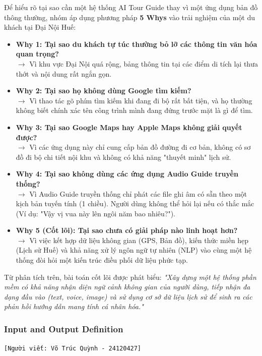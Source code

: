 Để hiểu rõ tại sao cần một hệ thống AI Tour Guide thay vì một ứng dụng bản đồ thông thường, nhóm áp dụng phương pháp \textbf{5 Whys} vào trải nghiệm của một du khách tại Đại Nội Huế:
\begin{itemize}
    \item \textbf{Why 1: Tại sao du khách tự túc thường bỏ lỡ các thông tin văn hóa quan trọng?} \\
    $\rightarrow$ Vì khu vực Đại Nội quá rộng, bảng thông tin tại các điểm di tích lại thưa thớt và nội dung rất ngắn gọn.
    \item \textbf{Why 2: Tại sao họ không dùng Google tìm kiếm?} \\
    $\rightarrow$ Vì thao tác gõ phím tìm kiếm khi đang đi bộ rất bất tiện, và họ thường không biết chính xác tên công trình mình đang đứng trước mặt là gì để tìm.
    \item \textbf{Why 3: Tại sao Google Maps hay Apple Maps không giải quyết được?} \\
    $\rightarrow$ Vì các ứng dụng này chỉ cung cấp bản đồ đường đi cơ bản, không có sơ đồ đi bộ chi tiết nội khu và không có khả năng "thuyết minh" lịch sử.
    \item \textbf{Why 4: Tại sao không dùng các ứng dụng Audio Guide truyền thống?} \\
    $\rightarrow$ Vì Audio Guide truyền thống chỉ phát các file ghi âm có sẵn theo một kịch bản tuyến tính (1 chiều). Người dùng không thể hỏi lại nếu có thắc mắc (Ví dụ: "Vậy vị vua này lên ngôi năm bao nhiêu?").
    \item \textbf{Why 5 (Cốt lõi): Tại sao chưa có giải pháp nào linh hoạt hơn?} \\
    $\rightarrow$ Vì việc kết hợp dữ liệu không gian (GPS, Bản đồ), kiến thức miền hẹp (Lịch sử Huế) và khả năng xử lý ngôn ngữ tự nhiên (NLP) vào cùng một hệ thống đòi hỏi một kiến trúc điều phối dữ liệu phức tạp.
\end{itemize}

Từ phân tích trên, bài toán cốt lõi được phát biểu: \textit{"Xây dựng một hệ thống phần mềm có khả năng nhận diện ngữ cảnh không gian của người dùng, tiếp nhận đa dạng đầu vào (text, voice, image) và sử dụng cơ sở dữ liệu lịch sử để sinh ra các phản hồi hướng dẫn mang tính cá nhân hóa."}

\subsubsection{Input and Output Definition}
\texttt{[Người viết: Võ Trúc Quỳnh - 24120427]}

